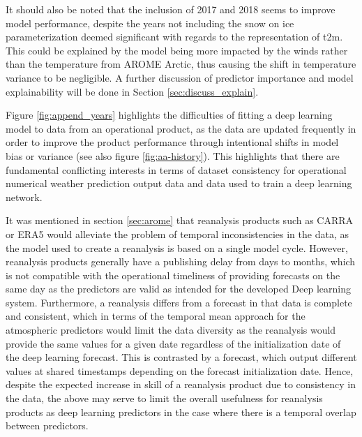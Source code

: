 \documentclass[../main/thesis]{subfiles}
\begin{document}
It should also be noted that the inclusion of 2017 and 2018 seems to improve model performance, despite the years not including the snow on ice parameterization deemed significant with regards to the representation of t2m. This could be explained by the model being more impacted by the winds rather than the temperature from AROME Arctic, thus causing the shift in temperature variance to be negligible. A further discussion of predictor importance and model explainability will be done in Section \ref{sec:discuss_explain}.

Figure \ref{fig:append_years} highlights the difficulties of fitting a deep learning model to data from an operational product, as the data are updated frequently in order to improve the product performance through intentional shifts in model bias or variance \citep{Batrak2019} (see also figure \ref{fig:aa-history}). This highlights that there are fundamental conflicting interests in terms of dataset consistency for operational numerical weather prediction output data and data used to train a deep learning network.

It was mentioned in section \ref{sec:arome} that reanalysis products such as CARRA \citep{Koeltzow2022} or ERA5 \citep{Hersbach2020} would alleviate the problem of temporal inconsistencies in the data, as the model used to create a reanalysis is based on a single model cycle. However, reanalysis products generally have a publishing delay from days to months, which is not compatible with the operational timeliness of providing forecasts on the same day as the predictors are valid as  intended for the developed Deep learning system. Furthermore, a reanalysis differs from a forecast in that data is complete and consistent, which in terms of the temporal mean approach for the atmospheric predictors would limit the data diversity as the reanalysis would provide the same values for a given date regardless of the initialization date of the deep learning forecast. This is contrasted by a forecast, which output different values at shared timestamps depending on the forecast initialization date. Hence, despite the expected increase in skill of a reanalysis product due to consistency in the data, the above may serve to limit the overall usefulness for reanalysis products as deep learning predictors in the case where there is a temporal overlap between predictors. 
\end{document}
